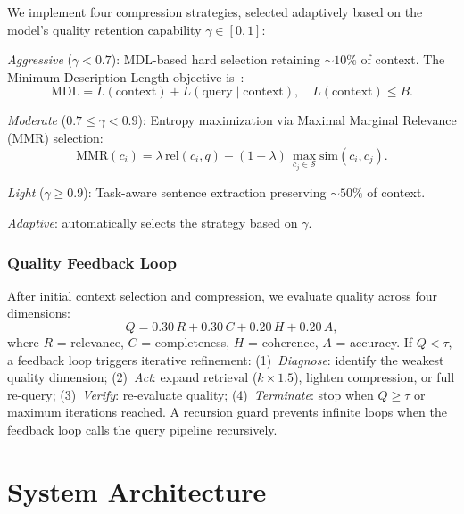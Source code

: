 \documentclass[journal]{IEEEtran}
\begin{document}
We implement four compression strategies, selected adaptively based on the
model's quality retention capability $\gamma \in [0,1]$:

\emph{Aggressive} ($\gamma < 0.7$): MDL-based hard selection retaining
${\sim}10\%$ of context.  The Minimum Description Length objective
is~\cite{grunwald2007mdl}:
\begin{equation}
  \mathrm{MDL} = L(\text{context}) + L(\text{query} \mid \text{context}),
  \quad L(\text{context}) \leq B.
  \label{eq:mdl}
\end{equation}

\emph{Moderate} ($0.7 \leq \gamma < 0.9$): Entropy maximization via
Maximal Marginal Relevance (MMR) selection:
\begin{equation}
  \mathrm{MMR}(c_i) =
    \lambda\, \mathrm{rel}(c_i, q)
    - (1-\lambda)\,
      \max_{c_j \in \mathcal{S}} \mathrm{sim}(c_i, c_j).
  \label{eq:mmr}
\end{equation}

\emph{Light} ($\gamma \geq 0.9$): Task-aware sentence extraction preserving
${\sim}50\%$ of context.

\emph{Adaptive}: automatically selects the strategy
based on $\gamma$.

\subsubsection{Quality Feedback Loop}
\label{sec:feedback}

After initial context selection and compression, we evaluate quality across
four dimensions:
\begin{equation}
  Q = 0.30\,R + 0.30\,C + 0.20\,H + 0.20\,A,
  \label{eq:quality}
\end{equation}
where $R$ = relevance, $C$ = completeness, $H$ = coherence, $A$ = accuracy.
If $Q < \tau$, a feedback loop triggers iterative refinement:
(1)~\emph{Diagnose}: identify the weakest quality dimension;
(2)~\emph{Act}: expand retrieval ($k \times 1.5$), lighten compression, or
full re-query;
(3)~\emph{Verify}: re-evaluate quality;
(4)~\emph{Terminate}: stop when $Q \geq \tau$ or maximum iterations reached.
A recursion guard prevents infinite loops when the feedback loop calls the
query pipeline recursively.


\section{System Architecture}
\label{sec:architecture}
\end{document}
